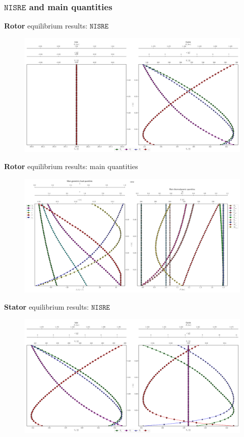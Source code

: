 	\subsubsection{$\mathtt{NISRE}$ and main quantities}
	\begin{frame}{\textbf{Rotor} equilibrium results: $\mathtt{NISRE}$}
		\begin{figure}
			\centering
			\includegraphics[width=1\textwidth]{figures/rotorVelocity.png}
		\end{figure}
	\end{frame}
	\begin{frame}{\textbf{Rotor} equilibrium results: main quantities}
		\begin{figure}
			\centering
			\includegraphics[width=1\textwidth]{figures/rotorThermo.png}
		\end{figure}
	\end{frame}
	\begin{frame}{\textbf{Stator} equilibrium results: $\mathtt{NISRE}$}
		\begin{figure}
			\centering
			\includegraphics[width=1\textwidth]{figures/statorVelocity.png}
		\end{figure}
	\end{frame}
